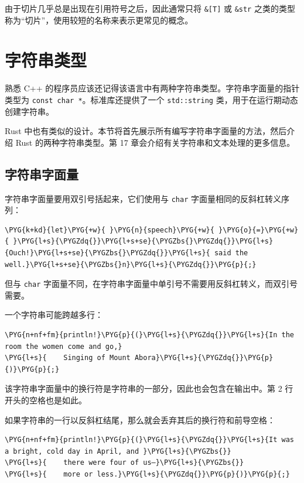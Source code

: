 由于切片几乎总是出现在引用符号之后，因此通常只将 \texttt{\&[T]} 或 \texttt{\&str} 之类的类型称为“切片”，使用较短的名称来表示更常见的概念。

\section{字符串类型}

熟悉 C++ 的程序员应该还记得该语言中有两种字符串类型。字符串字面量的指针类型为 \texttt{const char *}。标准库还提供了一个 \texttt{std::string} 类，用于在运行期动态创建字符串。

Rust 中也有类似的设计。本节将首先展示所有编写字符串字面量的方法，然后介绍 Rust 的两种字符串类型。第 17 章会介绍有关字符串和文本处理的更多信息。

\subsection{字符串字面量}

字符串字面量要用双引号括起来，它们使用与 \texttt{char} 字面量相同的反斜杠转义序列：

\begin{Verbatim}[commandchars=\\\{\},breaklines=true,breakanywhere=true,fontsize=\codefont,xleftmargin=17bp]
\PYG{k+kd}{let}\PYG{+w}{ }\PYG{n}{speech}\PYG{+w}{ }\PYG{o}{=}\PYG{+w}{ }\PYG{l+s}{\PYGZdq{}}\PYG{l+s+se}{\PYGZbs{}\PYGZdq{}}\PYG{l+s}{Ouch!}\PYG{l+s+se}{\PYGZbs{}\PYGZdq{}}\PYG{l+s}{ said the well.}\PYG{l+s+se}{\PYGZbs{}n}\PYG{l+s}{\PYGZdq{}}\PYG{p}{;}
\end{Verbatim}

但与 \texttt{char} 字面量不同，在字符串字面量中单引号不需要用反斜杠转义，而双引号需要。

一个字符串可能跨越多行：

\begin{Verbatim}[commandchars=\\\{\},breaklines=true,breakanywhere=true,fontsize=\codefont,xleftmargin=17bp]
\PYG{n+nf+fm}{println!}\PYG{p}{(}\PYG{l+s}{\PYGZdq{}}\PYG{l+s}{In the room the women come and go,}
\PYG{l+s}{    Singing of Mount Abora}\PYG{l+s}{\PYGZdq{}}\PYG{p}{)}\PYG{p}{;}
\end{Verbatim}

该字符串字面量中的换行符是字符串的一部分，因此也会包含在输出中。第 2 行开头的空格也是如此。

如果字符串的一行以反斜杠结尾，那么就会丢弃其后的换行符和前导空格：

\begin{Verbatim}[commandchars=\\\{\},breaklines=true,breakanywhere=true,fontsize=\codefont,xleftmargin=17bp]
\PYG{n+nf+fm}{println!}\PYG{p}{(}\PYG{l+s}{\PYGZdq{}}\PYG{l+s}{It was a bright, cold day in April, and }\PYG{l+s}{\PYGZbs{}}
\PYG{l+s}{    there were four of us—}\PYG{l+s}{\PYGZbs{}}
\PYG{l+s}{    more or less.}\PYG{l+s}{\PYGZdq{}}\PYG{p}{)}\PYG{p}{;}
\end{Verbatim}

